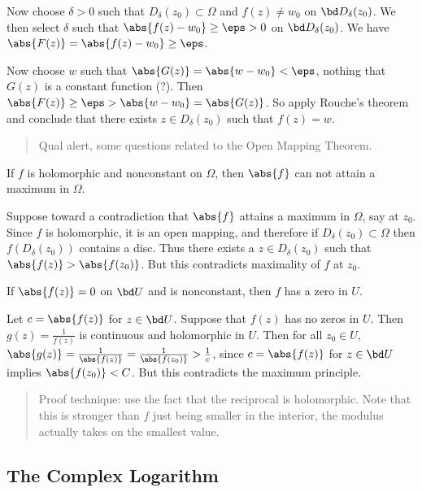 Now choose \(\delta>0\) such that \(D_\delta(z_0) \subset \Omega\) and
\(f(z) \neq w_0\) on \(\bd D_\delta(z_0)\). We then select \(\delta\)
such that \(\abs{f(z) - w_0} \geq \eps > 0\) on \(\bd D_\delta(z_0)\).
We have \(\abs{F(z)} = \abs{f(z) - w_0} \geq \eps\).

Now choose \(w\) such that \(\abs{G(z)} = \abs{w-w_0} < \eps\), nothing
that \(G(z)\) is a constant function (?). Then
\(\abs{F(z)} \geq \eps > \abs{w-w_0} = \abs{G(z)}\). So apply Rouche's
theorem and conclude that there exists \(z\in D_\delta(z_0)\) such that
\(f(z) = w\).

\begin{quote}
Qual alert, some questions related to the Open Mapping Theorem.
\end{quote}

\begin{description}
\tightlist
\item[Theorem (Stein 4.5: Maximum Modulus)]
If \(f\) is holomorphic and nonconstant on \(\Omega\), then \(\abs{f}\)
can not attain a maximum in \(\Omega\).
\item[Proof]
Suppose toward a contradiction that \(\abs{f}\) attains a maximum in
\(\Omega\), say at \(z_0\). Since \(f\) is holomorphic, it is an open
mapping, and therefore if \(D_\delta(z_0) \subset \Omega\) then
\(f(D_\delta(z_0))\) contains a disc. Thus there exists a
\(z\in D_\delta(z_0)\) such that \(\abs{f(z)} > \abs{f(z_0)}\). But this
contradicts maximality of \(f\) at \(z_0\).
\item[Corollary]
If \(\abs{f(z)} = 0\) on \(\bd U\) and is nonconstant, then \(f\) has a
zero in \(U\).
\item[Proof]
Let \(c = \abs{f(z)}\) for \(z\in \bd U\). Suppose that \(f(z)\) has no
zeros in \(U\). Then \(g(z) = \frac{1}{f(z)}\) is continuous and
holomorphic in \(U\). Then for all \(z_0 \in U\),
\(\abs{g(z)} = \frac{1}{\abs{f(z)}} = \frac{1}{\abs{f(z_0)}} > \frac 1 c\),
since \(c = \abs{f(z)}\) for \(z\in \bd U\) implies
\(\abs{f(z_0)} < C\). But this contradicts the maximum principle.
\end{description}

\begin{quote}
Proof technique: use the fact that the reciprocal is holomorphic. Note
that this is stronger than \(f\) just being smaller in the interior, the
modulus actually takes on the smallest value.
\end{quote}

\hypertarget{the-complex-logarithm}{%
\subsection{The Complex Logarithm}\label{the-complex-logarithm}}

